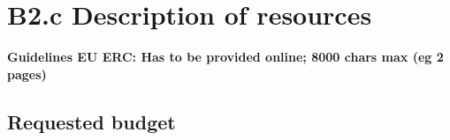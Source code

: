 \documentclass[11pt,a4paper]{report}
\newcommand{\eu}[1]{{\color{teal}\textbf{Guidelines EU ERC: #1}}}
\begin{document}





\newpage
\printbibliography

\newrefsection
\newpage
\chapter{B2.c Description of resources}

\eu{Has to be provided online; 8000 chars max (eg 2 pages)}


\section{Requested budget}
\end{document}

